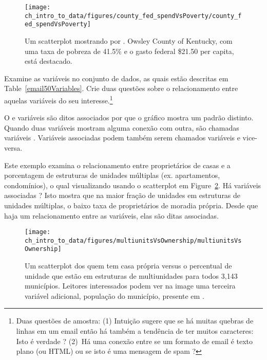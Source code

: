 \begin{figure}
\centering
\texttt{[image: ch\_intro\_to\_data/figures/county\_fed\_spendVsPoverty/county\_fed\_spendVsPoverty]}
\caption{Um scatterplot mostrando  por . Owsley County of Kentucky, com uma taxa de pobreza de 41.5\% e o gasto federal \$21.50 per capita, está destacado.}
\label{county_fed_spendVsPoverty}
\end{figure}

\begin{exercise}
Examine as variáveis no  conjunto de dados, as quais estão descritas em Table~\vref{email50Variables}. Crie duas questões sobre o relacionamento entre aquelas variáveis do seu interesse.\footnote{Duas questões de amostra: (1) Intuição sugere que se há muitas quebras de linhas em um email então há também a tendência de ter muitos caracteres: Isto é verdade ? (2)~Há uma conexão entre se um formato de email é texto plano (ou HTML) ou se isto é uma mensagem de spam ?}
\end{exercise}

O  e  variáveis são ditos associados por que o gráfico mostra um padrão distinto. Quando duas variáveis mostram alguma conexão com outra, são chamadas variáveis . Variáveis associadas podem também serem chamados variáveis  e vice-versa.

\begin{example}{Este exemplo examina o relacionamento entre proprietários de casas e a porcentagem de estruturas de unidades múltiplas (ex. apartamentos, condomínios), o qual visualizando usando o scatterplot em Figure~\ref{multiunitsVsOwnership}. Há variáveis associadas ?}
Isto mostra que na maior fração de unidades em estruturas de unidades múltiplas, o baixo taxa de proprietários de moradia própria. Desde que haja um relacionamento entre as variáveis, elas são ditas associadas.
\end{example}

\begin{figure}
   \centering
   \texttt{[image: ch\_intro\_to\_data/figures/multiunitsVsOwnership/multiunitsVsOwnership]}
   \caption{Um scatterplot dos quem tem casa própria versus o percentual de unidade que estão em estruturas de multiunidades para todos 3,143 municípios. Leitores interessados podem ver na image uma terceira variável adicional, população do município, presente em  .}
   \label{multiunitsVsOwnership}
\end{figure}

